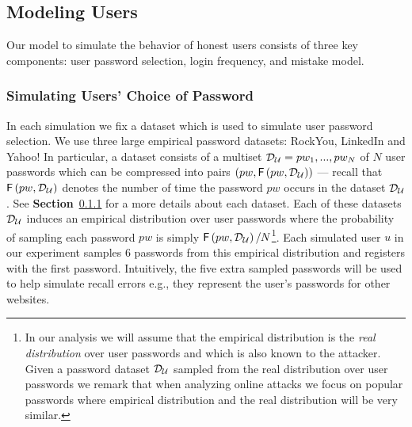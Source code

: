 \subsection{Modeling Users} \label{section:ExperimentDesign-subsection:SimulateUser}
Our model to simulate the behavior of honest users consists of three key components: user password selection, login frequency, and mistake model. %





\subsubsection{Simulating Users' Choice of Password}\label{section:ExperimentDesign-subsection:SimulateUser-subsubsection:SimulatePasswordChoice}
In each simulation we fix a dataset which is used to simulate user password selection. We use three large empirical password datasets: RockYou, LinkedIn and Yahoo! In particular, a dataset consists of a multiset  $\mathcal{D}_{{\mathcal{U}}} = {pw_1,...,pw_N}$ of $N$ user passwords which can be compressed into pairs $(pw,  \mathsf{F}\left(pw, \mathcal{D}_{{\mathcal{U}}} \right))$ --- recall that $\mathsf{F}\left(pw, \mathcal{D}_{{\mathcal{U}}} \right)$ denotes the number of time the password $pw$ occurs in the dataset $\mathcal{D}_{{\mathcal{U}}}$.   See  \textbf{Section}~\ref{section:ExperimentDesign-subsection:SimulateUser-subsubsection:SimulatePasswordChoice} for a more details about each dataset. Each of these datasets $\mathcal{D}_{{\mathcal{U}}} $ induces an empirical distribution over user passwords where the probability of sampling each password $pw$ is simply $\mathsf{F}\left(pw, \mathcal{D}_{{\mathcal{U}}}\right)/N$\footnote{In our analysis we will assume that the empirical distribution is the {\em real distribution} over user passwords and which is also known to the attacker. Given a password dataset $\mathcal{D}_{{\mathcal{U}}} $ sampled from the real distribution over user passwords we remark that when analyzing online attacks we focus on popular passwords where empirical distribution and the real distribution will be very similar. }.  Each simulated user $u$ in our experiment samples $6$ passwords from this empirical distribution and registers with the first password. Intuitively, the five extra sampled passwords will be used to help simulate recall errors e.g., they represent the user's passwords for other websites. 

